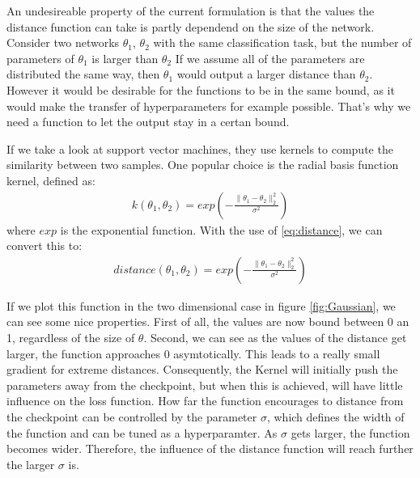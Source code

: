 An undesireable property of the current formulation is that the values the
distance function can take is partly dependend on the size of the network.
Consider two networks $\theta_1$, $\theta_2$ with the same classification task,
but the number of parameters of $\theta_1$ is larger than $\theta_2$ If we
assume all of the parameters are distributed the same way, then $\theta_1$ would
output a larger distance than $\theta_2$. However it would be desirable for the
functions to be in the same bound, as it would make the transfer of
hyperparameters for example possible. That's why we need a function to let the
output stay in a certan bound.

If we take a look at support vector machines, they use kernels to compute the
similarity between two samples. One popular choice is the radial basis function
kernel, defined as:
\begin{align}\label{eq:RBF}
    k(\theta_1, \theta_2)=exp(-\frac{\rVert \theta_1 - \theta_2 \lVert_2^2}{\sigma^2})
\end{align}
where $exp$ is the exponential function. With the use of \ref{eq:distance}, we
can convert this to:
\begin{align}\label{eq:DistanceFinal}
    distance(\theta_1, \theta_2)=exp(-\frac{\rVert \theta_1 - \theta_2 \lVert_2^2}{\sigma^2})
\end{align}

If we plot this function in the two dimensional case in figure
\ref{fig:Gaussian}, we can see some nice properties. First of all, the values
are now bound between 0 an 1, regardless of the size of $\theta$. Second, we can
see as the values of the distance get larger, the function approaches 0
asymtotically. This leads to a really small gradient for extreme distances.
Consequently, the Kernel will initially push the parameters away from the
checkpoint, but when this is achieved, will have little influence on the loss
function. How far the function encourages to distance from the checkpoint can be
controlled by the parameter $\sigma$, which defines the width of the function
and can be tuned as a hyperparamter. As $\sigma$ gets larger, the function
becomes wider. Therefore, the influence of the distance function will reach
further the larger $\sigma$ is.

